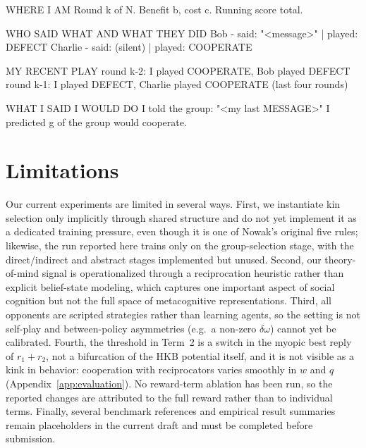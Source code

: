 \documentclass{article}
\begin{document}
\begin{memoryprompt}
WHERE I AM
Round {k} of {N}. Benefit {b}, cost {c}. Running score {total}.

WHO SAID WHAT AND WHAT THEY DID
Bob - said: "<message>" | played: DEFECT
Charlie - said: (silent) | played: COOPERATE

MY RECENT PLAY
round {k-2}: I played COOPERATE, Bob played DEFECT
round {k-1}: I played DEFECT, Charlie played COOPERATE   (last four rounds)

WHAT I SAID I WOULD DO
I told the group: "<my last MESSAGE>"
I predicted {g} of the group would cooperate.
\end{memoryprompt}

\section{Limitations}

Our current experiments are limited in several ways. First, we instantiate
kin selection only implicitly through shared structure and do not yet
implement it as a dedicated training pressure, even though it is one of
Nowak's original five rules; likewise, the run reported here trains only on
the group-selection stage, with the direct/indirect and abstract stages
implemented but unused. Second, our theory-of-mind signal is operationalized
through a reciprocation heuristic rather than explicit belief-state modeling,
which captures one important aspect of social cognition but not the full
space of metacognitive representations. Third, all opponents are scripted
strategies rather than learning agents, so the setting is not self-play and
between-policy asymmetries (e.g.\ a non-zero $\delta\omega$) cannot yet be
calibrated. Fourth, the threshold in Term~2 is a switch in the myopic best reply of
$r_1+r_2$, not a bifurcation of the HKB potential itself, and it is not
visible as a kink in behavior: cooperation with reciprocators varies smoothly
in $w$ and $q$ (Appendix~\ref{app:evaluation}). No reward-term ablation has
been run, so the reported changes are attributed to the full reward rather
than to individual terms. Finally, several benchmark references and empirical result
summaries remain placeholders in the current draft and must be completed
before submission.
\end{document}
